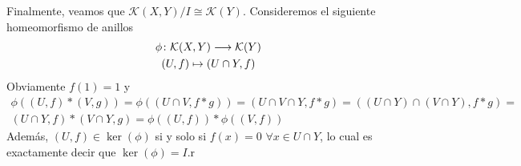 \documentclass[twoside]{article}
\begin{document}
\begin{ejercicio}{6}
\begin{solucion}
Finalmente, veamos que $\mathcal{K}(X,Y)/I \cong \mathcal{K}(Y)$. Consideremos el siguiente homeomorfismo de anillos
\begin{gather*}
\phi\colon{\mathcal{K}(X,Y)}\longrightarrow{\mathcal{K}(Y)}\\
(U,f)\mapsto (U\cap Y,f)
\end{gather*}
Obviamente $f(1)=1$ y 
\begin{gather*}
\phi((U,f)\ast (V,g)) = \phi((U\cap V, f\ast g)) = (U\cap V \cap Y, f\ast g) = ((U\cap Y)\cap (V\cap Y), f \ast g) =\\
(U\cap Y, f) \ast (V\cap Y, g) = \phi((U,f))\ast \phi((V,f)) 
\end{gather*}
Además, $(U,f)\in \ker(\phi)$ si y solo si $f(x)=0$ $\forall x \in U \cap Y$, lo cual es exactamente decir que $\ker(\phi)=I$.r
\end{solucion}
\end{ejercicio}
\end{document}
